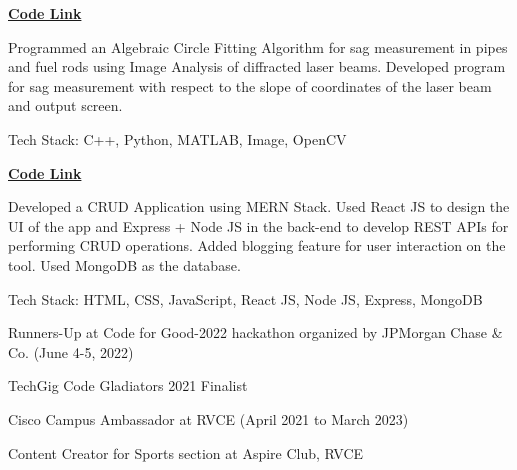 \documentclass[a4paper]{MagicalCV}
\begin{document}
\begin{minipage}[t]{0.66\textwidth}
\vspace{\topsep} %
\justify
\begin{tightemize}
\item \href{https://github.com/satviktiwari/Minor-Project}{\bf Code Link} 
\item Programmed an Algebraic Circle Fitting Algorithm for sag measurement in pipes and fuel rods using Image Analysis of diffracted laser beams. Developed program for sag measurement with
respect to the slope of coordinates of the laser beam and output screen.
\item Tech Stack: C++, Python, MATLAB, Image, OpenCV
\end{tightemize}
\sectionsep

\vspace{\topsep} %
\justify
\begin{tightemize}
\item \href{https://github.com/satviktiwari/CRUD-Application}{\bf Code Link}
\item Developed a CRUD Application using MERN Stack. Used React JS to design the UI of the app and Express + Node JS in the back-end to develop REST APIs for performing CRUD operations. Added blogging feature for user interaction on the tool. Used MongoDB as the database.
\item Tech Stack: HTML, CSS, JavaScript, React JS, Node JS, Express, MongoDB
\end{tightemize}
\sectionsep

\vspace{\topsep} %
\justify
\begin{tightemize} 
\item Runners-Up at Code for Good-2022 hackathon organized by JPMorgan Chase \& Co. (June 4-5, 2022)
\item TechGig Code Gladiators 2021 Finalist
\item Cisco Campus Ambassador at RVCE (April 2021 to March 2023)
\item Content Creator for Sports section at Aspire Club, RVCE
\end{tightemize}
\sectionsep


\end{minipage} 
\end{document}
